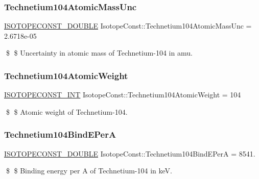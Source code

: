 \subsubsection{\texorpdfstring{Technetium104\+Atomic\+Mass\+Unc}{Technetium104AtomicMassUnc}}
{\footnotesize\ttfamily \mbox{\hyperlink{group___isotope_const-_macros_ga8f45a7272ce02c0b4c65c44636ed719a}{I\+S\+O\+T\+O\+P\+E\+C\+O\+N\+S\+T\+\_\+\+D\+O\+U\+B\+LE}} Isotope\+Const\+::\+Technetium104\+Atomic\+Mass\+Unc = 2.\+6718e-\/05}

\$ \$ Uncertainty in atomic mass of Technetium-\/104 in amu. \mbox{\label{group___isotope_const-_technetium-_tc104_ga1f4603d8ce188f98956cef351853d652}} 
\subsubsection{\texorpdfstring{Technetium104\+Atomic\+Weight}{Technetium104AtomicWeight}}
{\footnotesize\ttfamily \mbox{\hyperlink{group___isotope_const-_macros_ga5f18360b3e99483a35c32d789e62621c}{I\+S\+O\+T\+O\+P\+E\+C\+O\+N\+S\+T\+\_\+\+I\+NT}} Isotope\+Const\+::\+Technetium104\+Atomic\+Weight = 104}

\$ \$ Atomic weight of Technetium-\/104. \mbox{\label{group___isotope_const-_technetium-_tc104_gade7f96ce71d7bd68fbce4eca25ac7a29}} 
\subsubsection{\texorpdfstring{Technetium104\+Bind\+E\+PerA}{Technetium104BindEPerA}}
{\footnotesize\ttfamily \mbox{\hyperlink{group___isotope_const-_macros_ga8f45a7272ce02c0b4c65c44636ed719a}{I\+S\+O\+T\+O\+P\+E\+C\+O\+N\+S\+T\+\_\+\+D\+O\+U\+B\+LE}} Isotope\+Const\+::\+Technetium104\+Bind\+E\+PerA = 8541.}

\$ \$ Binding energy per A of Technetium-\/104 in keV. \mbox{\label{group___isotope_const-_technetium-_tc104_ga5591d54a914183044aea8cb5b77d89a7}} 
